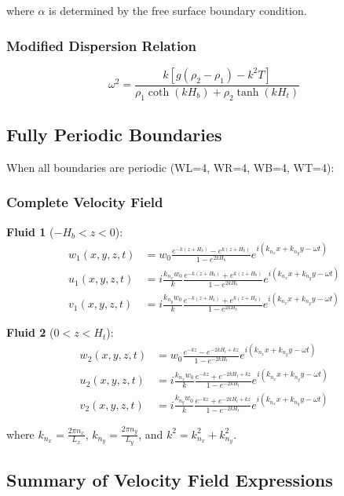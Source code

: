 \documentclass[12pt,a4paper]{article}
\begin{document}
where $\alpha$ is determined by the free surface boundary condition.

\subsubsection{Modified Dispersion Relation}
\begin{equation}
\omega^2 = \frac{k[g(\rho_2 - \rho_1) - k^2T]}{\rho_1\coth(kH_b) + \rho_2\tanh(kH_t)}
\end{equation}

\subsection{Fully Periodic Boundaries}

When all boundaries are periodic (WL=4, WR=4, WB=4, WT=4):

\subsubsection{Complete Velocity Field}

\textbf{Fluid 1} ($-H_b < z < 0$):
\begin{align}
w_1(x,y,z,t) &= w_0 \frac{e^{-k(z+H_b)} - e^{k(z+H_b)}}{1 - e^{2kH_b}} e^{i(k_{n_x} x + k_{n_y} y - \omega t)} \\
u_1(x,y,z,t) &= i\frac{k_{n_x} w_0}{k} \frac{e^{-k(z+H_b)} + e^{k(z+H_b)}}{1 - e^{2kH_b}} e^{i(k_{n_x} x + k_{n_y} y - \omega t)} \\
v_1(x,y,z,t) &= i\frac{k_{n_y} w_0}{k} \frac{e^{-k(z+H_b)} + e^{k(z+H_b)}}{1 - e^{2kH_b}} e^{i(k_{n_x} x + k_{n_y} y - \omega t)}
\end{align}

\textbf{Fluid 2} ($0 < z < H_t$):
\begin{align}
w_2(x,y,z,t) &= w_0 \frac{e^{-kz} - e^{-2kH_t+kz}}{1 - e^{-2kH_t}} e^{i(k_{n_x} x + k_{n_y} y - \omega t)} \\
u_2(x,y,z,t) &= i\frac{k_{n_x} w_0}{k} \frac{e^{-kz} + e^{-2kH_t+kz}}{1 - e^{-2kH_t}} e^{i(k_{n_x} x + k_{n_y} y - \omega t)} \\
v_2(x,y,z,t) &= i\frac{k_{n_y} w_0}{k} \frac{e^{-kz} + e^{-2kH_t+kz}}{1 - e^{-2kH_t}} e^{i(k_{n_x} x + k_{n_y} y - \omega t)}
\end{align}

where $k_{n_x} = \frac{2\pi n_x}{L_x}$, $k_{n_y} = \frac{2\pi n_y}{L_y}$, and $k^2 = k_{n_x}^2 + k_{n_y}^2$.

\subsection{Summary of Velocity Field Expressions}
\end{document}
